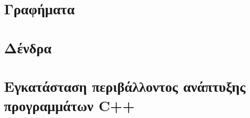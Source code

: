 \documentclass[11pt,a4paper,twoside,openany]{book}
\begin{document}
\chapter{Γραφήματα}


\chapter{Δένδρα}



\appendix
\chapter{Εγκατάσταση περιβάλλοντος ανάπτυξης προγραμμάτων C++}








\end{document}

